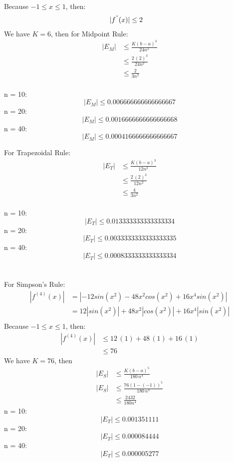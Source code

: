 \documentclass{article}
\begin{document}
    Because $-1 \leq x \leq 1$, then:
    \begin{align*}
        |f^{"}(x)| & \leq 2
    \end{align*}
    We have $K = 6$, then for Midpoint Rule:
    \begin{align*}
        |E_{M}| &\leq \frac{K(b-a)^{3}}{24n^2} \\
        &\leq \frac{2\,(2)^3}{24n^2} \\
        &\leq \frac{2}{3n^2}
    \end{align*} \\

    n = 10: \\
    $$ |E_{M}| \leq 0.006666666666666667 $$
    n = 20: \\
    $$ |E_{M}| \leq 0.0016666666666666668 $$
    n = 40: \\
    $$ |E_{M}| \leq 0.0004166666666666667 $$

    For Trapezoidal Rule:
    \begin{align*}
        |E_{T}| &\leq \frac{K(b-a)^{3}}{12n^2} \\
        &\leq \frac{2\,(2)^3}{12n^2} \\
        &\leq \frac{4}{3n^2}
    \end{align*} \\

    n = 10: \\
    $$ |E_{T}| \leq 0.013333333333333334 $$
    n = 20: \\
    $$ |E_{T}| \leq 0.0033333333333333335 $$
    n = 40: \\
    $$ |E_{T}| \leq 0.0008333333333333334 $$ \\\\

    For Simpson's Rule:\\
    \begin{align*}
        |f^{(4)}(x)| &= |-12sin(x^2) - 48x^2cos(x^2) + 16x^4sin(x^2)| \\
        &= 12|sin(x^2)| + 48 x^2 |cos(x^2)| + 16 x^4 |sin(x^2)| \\
    \end{align*}
    Because $-1 \leq x \leq 1$, then:
    \begin{align*}
        |f^{(4)}(x)| & \leq 12\,(1) + 48\,(1) + 16\,(1) \\
        & \leq 76
    \end{align*}
    We have $ K = 76$, then
    \begin{align*}
        |E_{S}| & \leq \frac{K(b-a)^5}{180\,n^4} \\
        |E_{S}| & \leq \frac{76(1-(-1))^5}{180\,n^4} \\
        &\leq \frac{2432}{180n^4}
    \end{align*}
    n = 10: \\
    $$ |E_{T}| \leq 0.001351111 $$
    n = 20: \\
    $$ |E_{T}| \leq 0.000084444 $$
    n = 40: \\
    $$ |E_{T}| \leq 0.000005277 $$ \\\\
\end{document}
